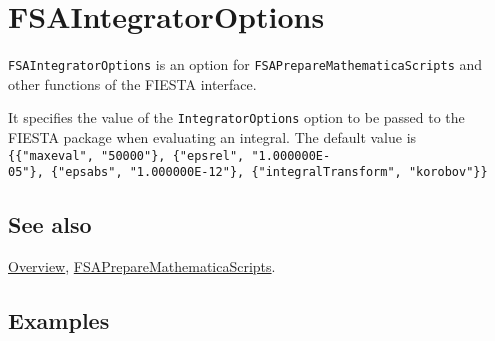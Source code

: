 \documentclass[../FeynHelpersManual.tex]{subfiles}
\begin{document}
\hypertarget{fsaintegratoroptions}{
\section{FSAIntegratorOptions}\label{fsaintegratoroptions}}

\texttt{FSAIntegratorOptions} is an option for
\texttt{FSAPrepareMathematicaScripts} and other functions of the FIESTA
interface.

It specifies the value of the \texttt{IntegratorOptions} option to be
passed to the FIESTA package when evaluating an integral. The default
value is
\texttt{\{\allowbreak{}\{\allowbreak{}"maxeval",\ \allowbreak{}"50000"\},\ \allowbreak{}\{\allowbreak{}"epsrel",\ \allowbreak{}"1.000000E-05"\},\ \allowbreak{}\{\allowbreak{}"epsabs",\ \allowbreak{}"1.000000E-12"\},\ \allowbreak{}\{\allowbreak{}"integralTransform",\ \allowbreak{}"korobov"\}\}}

\subsection{See also}

\hyperlink{toc}{Overview},
\hyperlink{fsapreparemathematicascripts}{FSAPrepareMathematicaScripts}.

\subsection{Examples}
\end{document}
